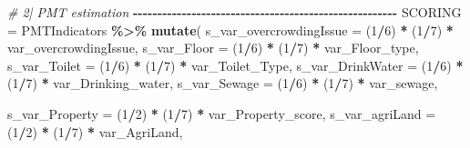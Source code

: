 \documentclass[
]{article}
\newenvironment{Shaded}{\begin{snugshade}}{\end{snugshade}}
\newcommand{\AttributeTok}[1]{\textcolor[rgb]{0.13,0.29,0.53}{#1}}
\newcommand{\CommentTok}[1]{\textcolor[rgb]{0.56,0.35,0.01}{\textit{#1}}}
\newcommand{\DecValTok}[1]{\textcolor[rgb]{0.00,0.00,0.81}{#1}}
\newcommand{\FunctionTok}[1]{\textcolor[rgb]{0.13,0.29,0.53}{\textbf{#1}}}
\newcommand{\NormalTok}[1]{#1}
\newcommand{\OtherTok}[1]{\textcolor[rgb]{0.56,0.35,0.01}{#1}}
\newcommand{\SpecialCharTok}[1]{\textcolor[rgb]{0.81,0.36,0.00}{\textbf{#1}}}
\begin{document}
\begin{Shaded}
\begin{Highlighting}[]
\CommentTok{\# 2| PMT estimation }
\SpecialCharTok{{-}{-}{-}{-}{-}{-}{-}{-}{-}{-}{-}{-}{-}{-}{-}{-}{-}{-}{-}{-}{-}{-}{-}{-}{-}{-}{-}{-}{-}{-}{-}{-}{-}{-}{-}{-}{-}{-}{-}{-}{-}{-}{-}{-}{-}{-}{-}{-}{-}{-}{-}{-}{-}{-}}
\NormalTok{SCORING }\OtherTok{=}\NormalTok{ PMTIndicators }\SpecialCharTok{\%\textgreater{}\%} 
  \FunctionTok{mutate}\NormalTok{(}
    \AttributeTok{s\_var\_overcrowdingIssue =}\NormalTok{ (}\DecValTok{1}\SpecialCharTok{/}\DecValTok{6}\NormalTok{) }\SpecialCharTok{*}\NormalTok{ (}\DecValTok{1}\SpecialCharTok{/}\DecValTok{7}\NormalTok{) }\SpecialCharTok{*}\NormalTok{ var\_overcrowdingIssue, }
    \AttributeTok{s\_var\_Floor =}\NormalTok{ (}\DecValTok{1}\SpecialCharTok{/}\DecValTok{6}\NormalTok{) }\SpecialCharTok{*}\NormalTok{ (}\DecValTok{1}\SpecialCharTok{/}\DecValTok{7}\NormalTok{) }\SpecialCharTok{*}\NormalTok{ var\_Floor\_type,}
    \AttributeTok{s\_var\_Toilet =}\NormalTok{ (}\DecValTok{1}\SpecialCharTok{/}\DecValTok{6}\NormalTok{) }\SpecialCharTok{*}\NormalTok{ (}\DecValTok{1}\SpecialCharTok{/}\DecValTok{7}\NormalTok{) }\SpecialCharTok{*}\NormalTok{ var\_Toilet\_Type,}
    \AttributeTok{s\_var\_DrinkWater =}\NormalTok{ (}\DecValTok{1}\SpecialCharTok{/}\DecValTok{6}\NormalTok{) }\SpecialCharTok{*}\NormalTok{ (}\DecValTok{1}\SpecialCharTok{/}\DecValTok{7}\NormalTok{) }\SpecialCharTok{*}\NormalTok{ var\_Drinking\_water,}
    \AttributeTok{s\_var\_Sewage =}\NormalTok{ (}\DecValTok{1}\SpecialCharTok{/}\DecValTok{6}\NormalTok{) }\SpecialCharTok{*}\NormalTok{ (}\DecValTok{1}\SpecialCharTok{/}\DecValTok{7}\NormalTok{) }\SpecialCharTok{*}\NormalTok{ var\_sewage,}
    
    \AttributeTok{s\_var\_Property =}\NormalTok{ (}\DecValTok{1}\SpecialCharTok{/}\DecValTok{2}\NormalTok{) }\SpecialCharTok{*}\NormalTok{ (}\DecValTok{1}\SpecialCharTok{/}\DecValTok{7}\NormalTok{) }\SpecialCharTok{*}\NormalTok{ var\_Property\_score,}
    \AttributeTok{s\_var\_agriLand =}\NormalTok{ (}\DecValTok{1}\SpecialCharTok{/}\DecValTok{2}\NormalTok{) }\SpecialCharTok{*}\NormalTok{ (}\DecValTok{1}\SpecialCharTok{/}\DecValTok{7}\NormalTok{) }\SpecialCharTok{*}\NormalTok{ var\_AgriLand,}
    

\end{Highlighting}
\end{Shaded}
\end{document}

